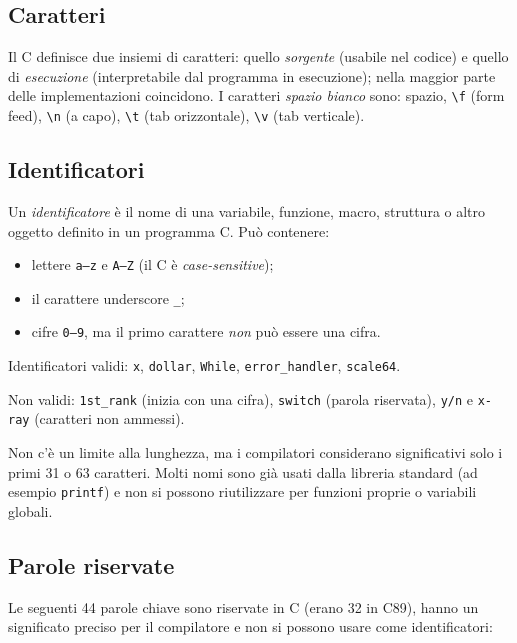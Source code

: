 \documentclass[11pt,a4paper]{article}
\begin{document}
\subsection{Caratteri}

Il C definisce due insiemi di caratteri: quello \emph{sorgente} (usabile nel
codice) e quello di \emph{esecuzione} (interpretabile dal programma in
esecuzione); nella maggior parte delle implementazioni coincidono. I caratteri
\emph{spazio bianco} sono: spazio, \verb|\f| (form feed), \verb|\n| (a capo),
\verb|\t| (tab orizzontale), \verb|\v| (tab verticale).

\subsection{Identificatori}

\begin{definizione}
Un \emph{identificatore} è il nome di una variabile, funzione, macro,
struttura o altro oggetto definito in un programma C. Può contenere:
\begin{itemize}
    \item lettere \texttt{a--z} e \texttt{A--Z} (il C è \emph{case-sensitive});
    \item il carattere underscore \texttt{\_};
    \item cifre \texttt{0--9}, ma il primo carattere \emph{non} può essere una cifra.
\end{itemize}
\end{definizione}

\begin{esempio}
Identificatori validi: \texttt{x}, \texttt{dollar}, \texttt{While},
\texttt{error\_handler}, \texttt{scale64}.

Non validi: \texttt{1st\_rank} (inizia con una cifra), \texttt{switch} (parola
riservata), \texttt{y/n} e \texttt{x-ray} (caratteri non ammessi).
\end{esempio}

Non c'è un limite alla lunghezza, ma i compilatori considerano significativi
solo i primi 31 o 63 caratteri. Molti nomi sono già usati dalla libreria
standard (ad esempio \lstinline|printf|) e non si possono riutilizzare per
funzioni proprie o variabili globali.

\subsection{Parole riservate}

Le seguenti 44 parole chiave sono riservate in C (erano 32 in C89), hanno un
significato preciso per il compilatore e non si possono usare come
identificatori:
\end{document}
